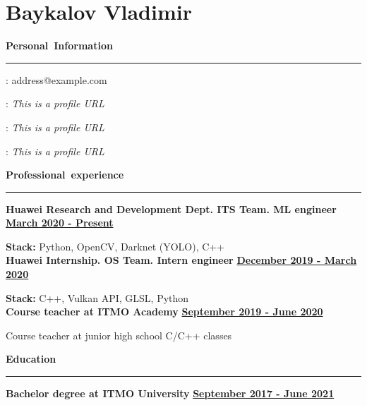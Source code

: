 \documentclass[11pt,a4paper]{report}
\author{Baykalov Vladimir}
\begin{document}
\section*{\huge{Baykalov Vladimir}}

\par\hbox{\Large\textbf{Personal Information}}\kern3pt\hrule
\begin{multicols}{2}

\hspace{5px}
\Letter: address@example.com

\hspace{5px}
\faLinkedin : \emph{This is a profile URL}

\par

\faGithub:  \emph{This is a profile URL}

\faSend:  \emph{This is a profile URL}

\end{multicols}

\par\hbox{\Large\textbf{Professional experience}}\kern3pt\hrule\kern10pt


\textbf {Huawei Research and Development Dept. ITS Team. ML engineer}
\hfill
\textbf {\underline{March 2020 - Present}}

\vspace{5px}
\hspace{10px}
\textbf{Stack:} Python, OpenCV, Darknet (YOLO), C++\\


\textbf {Huawei Internship. OS Team. Intern engineer }
\hfill
\textbf {\underline{December 2019 - March 2020}}

\vspace{5px}
\hspace{10px}
\textbf{Stack:} C++, Vulkan API, GLSL, Python \\


\textbf {Course teacher at ITMO Academy}
\hfill
\textbf {\underline{September 2019 - June 2020}}

\vspace{5px}
\hspace{10px}
Course teacher at junior high school C/C++ classes \\

\par\hbox{\Large\textbf{Education}}\kern5pt\hrule\kern10pt

\textbf{Bachelor degree at ITMO University}
\hfill
\textbf{\underline{September 2017 - June 2021}}
\end{document}
